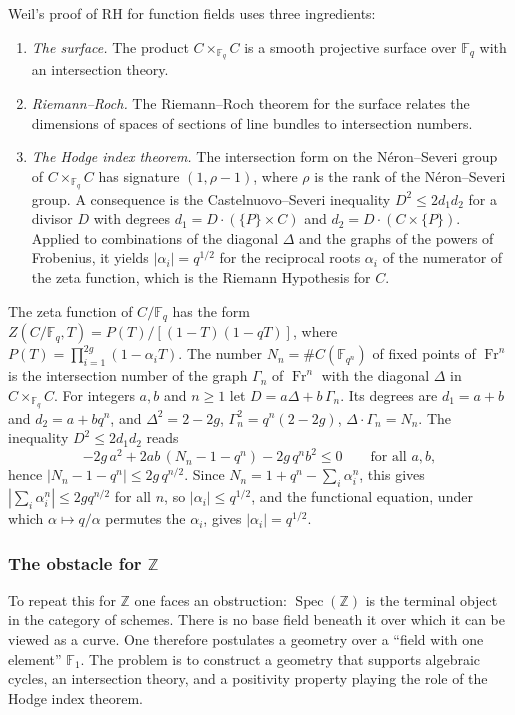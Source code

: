 \documentclass[11pt]{amsart}
\theoremstyle{definition}
\theoremstyle{remark}
\begin{document}
Weil's proof of RH for function fields uses three ingredients:
\begin{enumerate}[label=(\roman*)]
\item \emph{The surface.} The product $C \times_{\mathbb{F}_q} C$ is a smooth projective surface over $\mathbb{F}_q$ with an intersection theory.
\item \emph{Riemann--Roch.} The Riemann--Roch theorem for the surface relates the dimensions of spaces of sections of line bundles to intersection numbers.
\item \emph{The Hodge index theorem.} The intersection form on the N\'eron--Severi group of $C \times_{\mathbb{F}_q} C$ has signature $(1, \rho-1)$, where $\rho$ is the rank of the N\'eron--Severi group. A consequence is the Castelnuovo--Severi inequality $D^2\le 2d_1d_2$ for a divisor $D$ with degrees $d_1=D\cdot(\{P\}\times C)$ and $d_2=D\cdot(C\times\{P\})$. Applied to combinations of the diagonal $\Delta$ and the graphs of the powers of Frobenius, it yields $|\alpha_i| = q^{1/2}$ for the reciprocal roots $\alpha_i$ of the numerator of the zeta function, which is the Riemann Hypothesis for $C$.
\end{enumerate}

The zeta function of $C/\mathbb{F}_q$ has the form $Z(C/\mathbb{F}_q, T) = P(T)/[(1-T)(1-qT)]$, where $P(T) = \prod_{i=1}^{2g}(1 - \alpha_i T)$. The number $N_n=\#C(\mathbb{F}_{q^n})$ of fixed points of $\operatorname{Fr}^n$ is the intersection number of the graph $\Gamma_n$ of $\operatorname{Fr}^n$ with the diagonal $\Delta$ in $C \times_{\mathbb{F}_q} C$. For integers $a,b$ and $n\ge1$ let $D=a\Delta+b\,\Gamma_n$. Its degrees are $d_1=a+b$ and $d_2=a+bq^n$, and $\Delta^2=2-2g$, $\Gamma_n^2=q^n(2-2g)$, $\Delta\cdot\Gamma_n=N_n$. The inequality $D^2\le 2d_1d_2$ reads
\[
-2g\,a^2+2ab\,(N_n-1-q^n)-2g\,q^n b^2\le0\qquad\text{for all }a,b,
\]
hence $|N_n-1-q^n|\le 2g\,q^{n/2}$. Since $N_n=1+q^n-\sum_i\alpha_i^n$, this gives $|\sum_i\alpha_i^n|\le 2gq^{n/2}$ for all $n$, so $|\alpha_i|\le q^{1/2}$, and the functional equation, under which $\alpha\mapsto q/\alpha$ permutes the $\alpha_i$, gives $|\alpha_i|=q^{1/2}$.

\subsubsection{The obstacle for \texorpdfstring{$\mathbb{Z}$}{Z}}

To repeat this for $\mathbb{Z}$ one faces an obstruction: $\operatorname{Spec}(\mathbb{Z})$ is the terminal object in the category of schemes. There is no base field beneath it over which it can be viewed as a curve. One therefore postulates a geometry over a ``field with one element'' $\mathbb{F}_1$. The problem is to construct a geometry that supports algebraic cycles, an intersection theory, and a positivity property playing the role of the Hodge index theorem.
\end{document}
